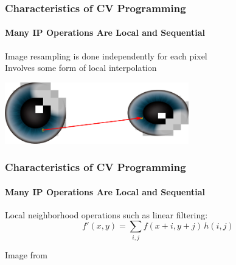 \documentclass[xetex,professionalfont]{beamer}
\begin{document}

\begin{frame}
\frametitle{Characteristics of CV Programming}
\framesubtitle{Many IP Operations Are Local and Sequential}

Image resampling is done independently for each pixel\\ %
Involves some form of local interpolation

\medskip
\begin{center}
	\includegraphics[width=8cm]{figures/resampling.png}
\end{center}

\end{frame}


\begin{frame}
\frametitle{Characteristics of CV Programming}
\framesubtitle{Many IP Operations Are Local and Sequential}

Local neighborhood operations such as linear filtering:
\[
 f'(x,y)=\sum_{i,j}f(x+i,y+j)\,h(i,j)
\]

\medskip
\begin{center}
	{\centering Image from \cite{prince12}}
\end{center}

\end{frame}

\end{document}
